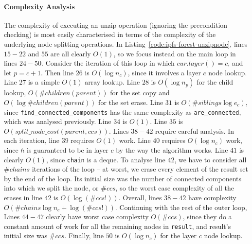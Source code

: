 \paragraph{Complexity Analysis}

The complexity of executing an unzip operation (ignoring the precondition checking) is most easily characterised in terms of the complexity of the underlying node splitting operations. In Listing~\ref{code:ipfs-forest-unzipnode}, lines $15-22$ and $55$ are all clearly $O(1)$, so we focus instead on the main loop in lines $24-50$. Consider the iteration of this loop in which $cur.layer() = c$, and let $p = c+1$. Then line $26$ is $O(\log n_c)$, since it involves a layer $c$ node lookup. Line $27$ is a simple $O(1)$ array lookup. Line $28$ is $O(\log n_p)$ for the child lookup, $O(\#\mathit{children}(parent))$ for the set copy and $O(\log \#\mathit{children}(parent))$ for the set erase. Line $31$ is $O(\#\mathit{siblings} \log e_c)$, since \texttt{find_connected_components} has the same complexity as \texttt{are_connected}, which was analysed previously. Line $34$ is $O(1)$. Line $35$ is $O(\mathit{split\_node\_cost}(parent, ccs))$. Lines $38-42$ require careful analysis. In each iteration, line $39$ requires $O(1)$ work. Line $40$ requires $O(\log n_c)$ work, since $h$ is guaranteed to be in layer $c$ by the way the algorithm works. Line $41$ is clearly $O(1)$, since \texttt{chain} is a deque. To analyse line $42$, we have to consider all $\#\mathit{chains}$ iterations of the loop -- at worst, we erase every element of the result set by the end of the loop. Its initial size was the number of connected components into which we split the node, or $\#\mathit{ccs}$, so the worst case complexity of all the erases in line $42$ is $O(\log(\#\mathit{ccs}!))$. Overall, lines $38-42$ have complexity $O(\#\mathit{chains} \log n_c + \log(\#\mathit{ccs}!))$. Continuing with the rest of the outer loop, Lines $44-47$ clearly have worst case complexity $O(\#\mathit{ccs})$, since they do a constant amount of work for all the remaining nodes in \texttt{result}, and result's initial size was $\#\mathit{ccs}$. Finally, line $50$ is $O(\log n_c)$ for the layer $c$ node lookup.

